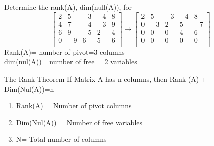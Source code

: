 \begin{ex}
Determine the rank(A), dim(null(A)), for $$\begin{bmatrix}
2 & 5 & -3 &-4 &8\\
4 & 7 & -4 & -3 & 9\\
6 & 9 & -5 & 2 & 4\\
0 & -9 & 6 & 5 & 6\\
\end{bmatrix} \rightarrow \begin{bmatrix}
2 & 5 & -3 & -4 & 8\\
0 & -3 & 2 & 5 & -7\\
0 & 0 & 0 & 4 & 6\\
0 & 0 & 0 & 0 & 0\\
\end{bmatrix}$$
Rank(A)= number of pivot=3 columns\\
dim(nul(A)) =number of free = 2 variables
\end{ex}
\begin{imp:thm}{The Rank Theorem}{} If Matrix A has n columns, then Rank (A) + Dim(Nul(A))=n
\begin{enumerate}
\item Rank(A) = Number of pivot columns
\item Dim(Nul(A)) = Number of free variables
\item N= Total number of columns
\end{enumerate}
\end{imp:thm}
